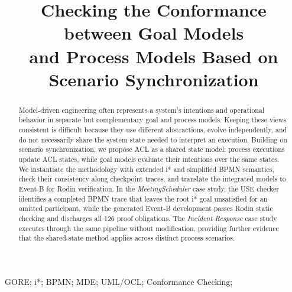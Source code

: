 \documentclass[a4paper, conference]{IEEEtran}
\begin{document}
\title{
\huge Checking the Conformance between Goal Models \\
and Process Models Based on Scenario Synchronization
}

\author{
}

\pagestyle{empty}
\maketitle
\thispagestyle{plain} %
\pagestyle{plain}    %
\begin{abstract}
Model-driven engineering often represents a system's intentions and operational behavior in separate but complementary goal and process models. Keeping these views consistent is difficult because they use different abstractions, evolve independently, and do not necessarily share the system state needed to interpret an execution. Building on scenario synchronization, we propose ACL as a shared state model: process executions update ACL states, while goal models evaluate their intentions over the same states. We instantiate the methodology with extended i* and simplified BPMN semantics, check their consistency along checkpoint traces, and translate the integrated models to Event-B for Rodin verification. In the \textit{MeetingScheduler} case study, the USE checker identifies a completed BPMN trace that leaves the root i* goal unsatisfied for an omitted participant, while the generated Event-B development passes Rodin static checking and discharges all 126 proof obligations. The \textit{Incident Response} case study executes through the same pipeline without modification, providing further evidence that the shared-state method applies across distinct process scenarios.
\end{abstract}
\begin{IEEEkeywords}
	GORE; i*; BPMN; MDE; UML/OCL; Conformance Checking;
\end{IEEEkeywords}
\end{document}
